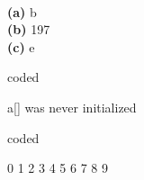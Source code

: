 \documentclass[10pt,a4paper]{article}
\newenvironment{problem}[2][Problem]{\begin{trivlist}
	\item[\hskip \labelsep {\bfseries #1}\hskip \labelsep {\bfseries #2}]}{\end{trivlist}}
\renewcommand\part[1]{\vspace{.10in}\textbf{\\(#1)}}
\begin{document}
\part{a} b
\part{b} 197
\part{c} e

\begin{problem}{1.1.9} coded
\end{problem}

\begin{problem}{1.1.10}
\end{problem}

a[] was never initialized

\begin{problem}{1.1.11} coded
\end{problem}

\begin{problem}{1.1.12}
\end{problem}

0 1 2 3 4 5 6 7 8 9
\end{document}
